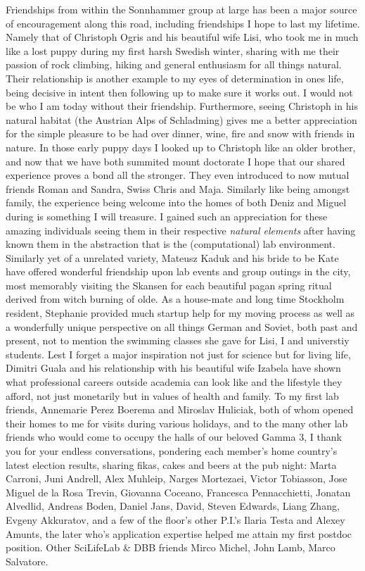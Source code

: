 Friendships from within the Sonnhammer group at large has been a major source of encouragement along this road, including friendships I hope to last my lifetime. Namely that of Christoph Ogris and his beautiful wife Lisi, who took me in much like a lost puppy during my first harsh Swedish winter, sharing with me their passion of rock climbing, hiking and general enthusiasm for all things natural. Their relationship is another example to my eyes of determination in ones life, being decisive in intent then following up to make sure it works out. I would not be who I am today without their friendship. Furthermore, seeing Christoph in his natural habitat (the Austrian Alps of Schladming) gives me a better appreciation for the simple pleasure to be had over dinner, wine, fire and snow with friends in nature. In those early puppy days I looked up to Christoph like an older brother, and now that we have both summited mount doctorate I hope that our shared experience proves a bond all the stronger. They even introduced to now mutual friends Roman and Sandra, Swiss Chris and Maja. Similarly like being amongst family, the experience being welcome into the homes of both Deniz and Miguel during is something I will treasure. I gained such an appreciation for these amazing individuals seeing them in their respective \emph{natural elements} after having known them in the abstraction that is the (computational) lab environment. Similarly yet of a unrelated variety, Mateusz Kaduk and his bride to be Kate have offered wonderful friendship upon lab events and group outings in the city, most memorably visiting the Skansen for each beautiful pagan spring ritual derived from witch burning of olde. As a house-mate and long time Stockholm resident, Stephanie provided much startup help for my moving process as well as a wonderfully unique perspective on all things German and Soviet, both past and present, not to mention the swimming classes she gave for Lisi, I and universtiy students. Lest I forget a major inspiration not just for science but for living life, Dimitri Guala and his relationship with his beautiful wife Izabela have shown what professional careers outside academia can look like and the lifestyle they afford, not just monetarily but in values of health and family. 
To my first lab friends, Annemarie Perez Boerema and Miroslav Huliciak, both of whom opened their homes to me for visits during various holidays, and to the many other lab friends who would come to occupy the halls of our beloved Gamma 3, I thank you for your endless conversations, pondering each member's home country's latest election results, sharing fikas, cakes and beers at the pub night: Marta Carroni, Juni Andrell, Alex Muhleip, Narges Mortezaei, Victor Tobiasson, Jose Miguel de la Rosa Trevin, Giovanna Coceano, Francesca Pennacchietti, Jonatan Alvedlid, Andreas Boden, Daniel Jans, David, Steven Edwards, Liang Zhang, Evgeny Akkuratov, and a few of the floor's other P.I.'s Ilaria Testa and Alexey Amunts, the later who's application expertise helped me attain my first postdoc position. Other SciLifeLab \& DBB friends Mirco Michel, John Lamb, Marco Salvatore. 

